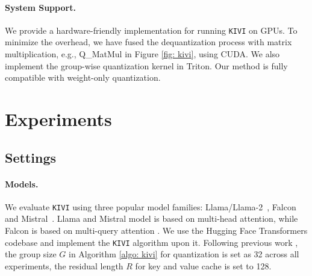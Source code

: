 \paragraph{System Support.} We provide a hardware-friendly implementation for running \texttt{KIVI} on GPUs. To minimize the overhead, we have fused the dequantization process with matrix multiplication, e.g., Q\_MatMul in Figure \ref{fig: kivi}, using CUDA. We also implement the group-wise quantization kernel in Triton. Our method is fully compatible with weight-only quantization.

\section{Experiments}

\subsection{Settings}
\label{sec: setting}
\paragraph{Models.} We evaluate \texttt{KIVI} using three popular model families: Llama/Llama-2~\citep{touvron2023llama, touvron2023llama2}, Falcon~\citep{penedo2023refinedweb} and Mistral~\citep{jiang2023mistral}. Llama and Mistral model is based on multi-head attention, while Falcon is based on multi-query attention \citep{mqa}. We use the Hugging Face Transformers codebase and implement the \texttt{KIVI} algorithm upon it. Following previous work \citep{flexgen}, the group size $G$ in Algorithm \ref{algo: kivi} for quantization is set as 32 across all experiments, the residual length $R$ for key and value cache is set to 128.

